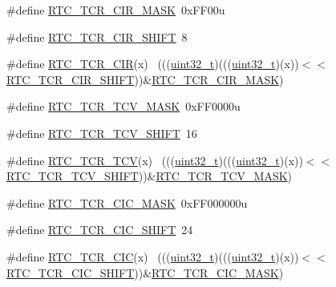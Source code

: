 \begin{DoxyCompactItemize}
\item 
\#define \hyperlink{group___r_t_c___register___masks_ga8f198d1dbc7427e1dfabdc4e9f53f8e2}{R\+T\+C\+\_\+\+T\+C\+R\+\_\+\+C\+I\+R\+\_\+\+M\+A\+SK}~0x\+F\+F00u
\item 
\#define \hyperlink{group___r_t_c___register___masks_ga4b8c9ecf8ed798b8c0173ce122874c5e}{R\+T\+C\+\_\+\+T\+C\+R\+\_\+\+C\+I\+R\+\_\+\+S\+H\+I\+FT}~8
\item 
\#define \hyperlink{group___r_t_c___register___masks_gaa25059e7519bf8e6316b66836be1cb18}{R\+T\+C\+\_\+\+T\+C\+R\+\_\+\+C\+IR}(x)                                                  ~(((\hyperlink{_p_e___types_8h_a33594304e786b158f3fb30289278f5af}{uint32\+\_\+t})(((\hyperlink{_p_e___types_8h_a33594304e786b158f3fb30289278f5af}{uint32\+\_\+t})(x))$<$$<$\hyperlink{group___r_t_c___register___masks_ga4b8c9ecf8ed798b8c0173ce122874c5e}{R\+T\+C\+\_\+\+T\+C\+R\+\_\+\+C\+I\+R\+\_\+\+S\+H\+I\+FT}))\&\hyperlink{group___r_t_c___register___masks_ga8f198d1dbc7427e1dfabdc4e9f53f8e2}{R\+T\+C\+\_\+\+T\+C\+R\+\_\+\+C\+I\+R\+\_\+\+M\+A\+SK})
\item 
\#define \hyperlink{group___r_t_c___register___masks_ga920f92da02ac0a6ae0931645600e2405}{R\+T\+C\+\_\+\+T\+C\+R\+\_\+\+T\+C\+V\+\_\+\+M\+A\+SK}~0x\+F\+F0000u
\item 
\#define \hyperlink{group___r_t_c___register___masks_ga6bcbafe57cdb430da5ee6902e0bcb224}{R\+T\+C\+\_\+\+T\+C\+R\+\_\+\+T\+C\+V\+\_\+\+S\+H\+I\+FT}~16
\item 
\#define \hyperlink{group___r_t_c___register___masks_ga93b83f72083cd3683e8b75554763bc93}{R\+T\+C\+\_\+\+T\+C\+R\+\_\+\+T\+CV}(x)                                                  ~(((\hyperlink{_p_e___types_8h_a33594304e786b158f3fb30289278f5af}{uint32\+\_\+t})(((\hyperlink{_p_e___types_8h_a33594304e786b158f3fb30289278f5af}{uint32\+\_\+t})(x))$<$$<$\hyperlink{group___r_t_c___register___masks_ga6bcbafe57cdb430da5ee6902e0bcb224}{R\+T\+C\+\_\+\+T\+C\+R\+\_\+\+T\+C\+V\+\_\+\+S\+H\+I\+FT}))\&\hyperlink{group___r_t_c___register___masks_ga920f92da02ac0a6ae0931645600e2405}{R\+T\+C\+\_\+\+T\+C\+R\+\_\+\+T\+C\+V\+\_\+\+M\+A\+SK})
\item 
\#define \hyperlink{group___r_t_c___register___masks_ga788e49f72c48b3c98794b49e27337c64}{R\+T\+C\+\_\+\+T\+C\+R\+\_\+\+C\+I\+C\+\_\+\+M\+A\+SK}~0x\+F\+F000000u
\item 
\#define \hyperlink{group___r_t_c___register___masks_ga84c801695fa1e344e7b2c8e6568cb7c8}{R\+T\+C\+\_\+\+T\+C\+R\+\_\+\+C\+I\+C\+\_\+\+S\+H\+I\+FT}~24
\item 
\#define \hyperlink{group___r_t_c___register___masks_ga18cbc5e75c4ab9ec5664b35a8afc9c4f}{R\+T\+C\+\_\+\+T\+C\+R\+\_\+\+C\+IC}(x)                                                  ~(((\hyperlink{_p_e___types_8h_a33594304e786b158f3fb30289278f5af}{uint32\+\_\+t})(((\hyperlink{_p_e___types_8h_a33594304e786b158f3fb30289278f5af}{uint32\+\_\+t})(x))$<$$<$\hyperlink{group___r_t_c___register___masks_ga84c801695fa1e344e7b2c8e6568cb7c8}{R\+T\+C\+\_\+\+T\+C\+R\+\_\+\+C\+I\+C\+\_\+\+S\+H\+I\+FT}))\&\hyperlink{group___r_t_c___register___masks_ga788e49f72c48b3c98794b49e27337c64}{R\+T\+C\+\_\+\+T\+C\+R\+\_\+\+C\+I\+C\+\_\+\+M\+A\+SK})
$$
\end{DoxyCompactItemize}
